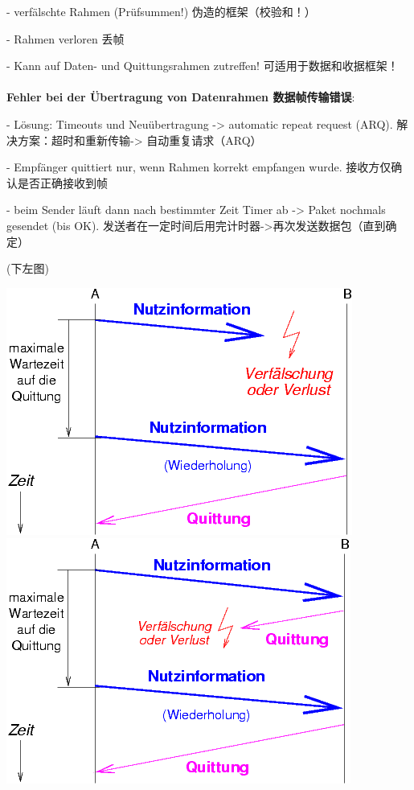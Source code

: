 \documentclass[fleqn]{article}
\begin{document}
- verfälschte Rahmen (Prüfsummen!) 伪造的框架（校验和！） 

- Rahmen verloren 丢帧

- Kann auf Daten- und Quittungsrahmen zutreffen! 可适用于数据和收据框架！
\\
\\
\noindent \textbf{Fehler bei der Übertragung von Datenrahmen 数据帧传输错误}:

- Lösung: Timeouts und Neuübertragung -> automatic repeat request (ARQ). 解决方案：超时和重新传输-> 自动重复请求（ARQ）

- Empfänger quittiert nur, wenn Rahmen korrekt empfangen wurde. 接收方仅确认是否正确接收到帧 

- beim Sender läuft dann nach bestimmter Zeit Timer ab -> Paket nochmals gesendet (bis OK). 发送者在一定时间后用完计时器->再次发送数据包（直到确定）

(下左图)

\begin{center}
    \includegraphics[scale=0.5]{bild24.png}
    \includegraphics[scale=0.5]{bild25.png}
\end{center}
\end{document}
